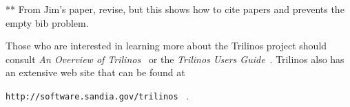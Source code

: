 \documentclass[12pt,relax]{article}
\newcommand{\InlineDirectory}[1]{
  {\hspace{0.01 in}} {\tt #1} {\hspace{0.01 in}}}
\begin{document}
\clearpage


** From Jim's paper, revise, but this shows how to cite papers and prevents the
empty bib problem.

Those who are interested in learning more about the Trilinos project should 
consult {\it An Overview of Trilinos}~\cite{Trilinos-Overview} or the
{\it Trilinos Users Guide}~\cite{Trilinos-Users-Guide}.  Trilinos also has an 
extensive web site that can be found at \newline
\InlineDirectory{http://software.sandia.gov/trilinos}~\cite{Trilinos-home-page}.

\clearpage



%

\end{document}
